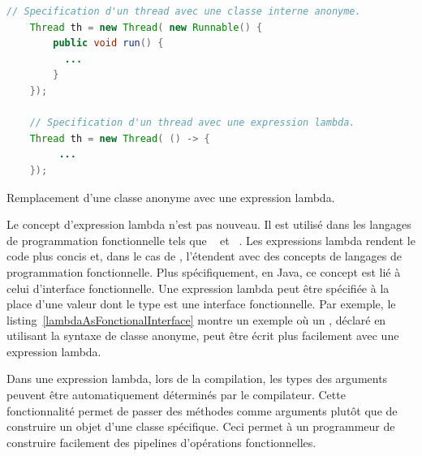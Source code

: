 



\begin{Listing}[tbp]
\begin{lstlisting}[language=java]
    // Specification d'un thread avec une classe interne anonyme.
	Thread th = new Thread( new Runnable() {
		public void run() {
          ...
		}
	});

    // Specification d'un thread avec une expression lambda.
	Thread th = new Thread( () -> {
         ...
	});
\end{lstlisting}
\caption{Remplacement d'une classe anonyme avec une expression lambda.}
\label{lambdaAsFonctionalInterface}
\end{Listing}

Le concept d'expression lambda n'est pas nouveau. Il est utilis\'e dans les langages de programmation fonctionnelle tels que ~\citep{hutton2016programming} et ~\citep{steele1990common}. 
%
Les expressions lambda rendent le code plus concis et, dans le cas de , l'\'etendent avec des concepts de langages de programmation fonctionnelle. 
%
Plus sp\'ecifiquement, en Java, ce concept est li\'e \`a celui d'interface fonctionnelle. Une expression lambda peut \^etre sp\'ecifi\'ee \`a la place d'une valeur dont le type est une interface fonctionnelle. Par exemple, le listing~\ref{lambdaAsFonctionalInterface} montre un exemple o\`u un , d\'eclar\'e en utilisant la syntaxe de classe anonyme, peut \^etre \'ecrit plus facilement avec une expression lambda.

Dans une expression lambda, lors de la compilation, les types des arguments peuvent \^etre automatiquement d\'etermin\'es par le compilateur. Cette fonctionnalit\'e permet de passer des m\'ethodes comme arguments plut\^ot que de construire un objet d'une classe sp\'ecifique. Ceci permet \`a un programmeur de construire facilement des pipelines d'op\'erations fonctionnelles.


